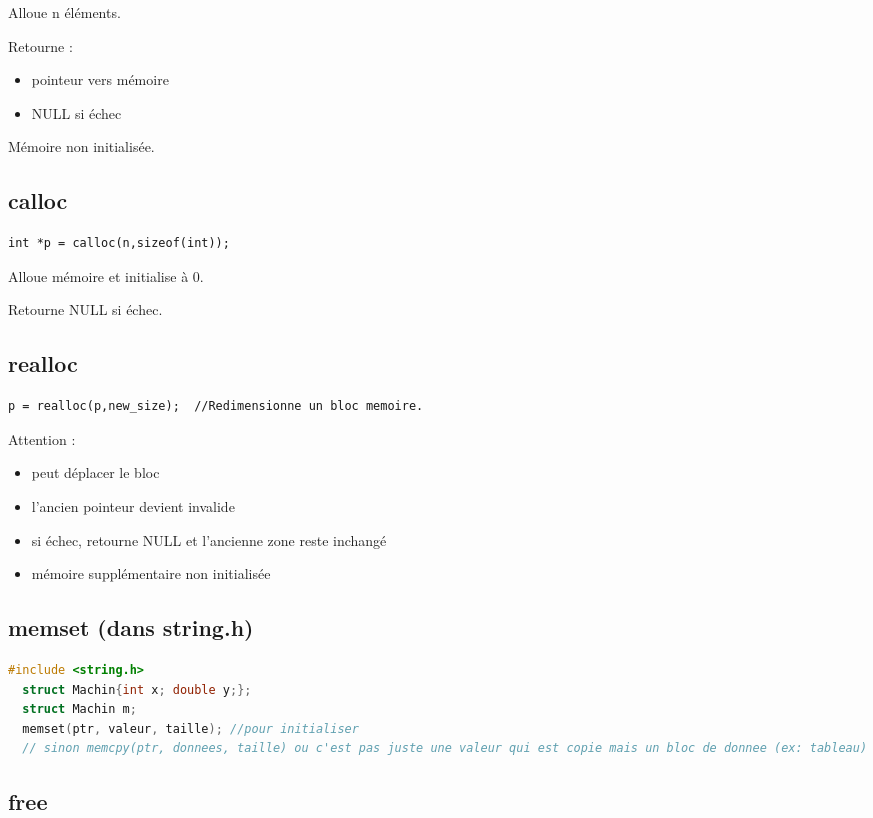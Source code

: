 \documentclass[8pt]{article}
\begin{document}
\begin{multicols}{2}
Alloue n éléments.

Retourne :

\begin{itemize}
\item pointeur vers mémoire
\item NULL si échec
\end{itemize}

Mémoire non initialisée.

\subsection{calloc}

\begin{lstlisting}
int *p = calloc(n,sizeof(int));
\end{lstlisting}

Alloue mémoire et initialise à 0.

Retourne NULL si échec.

\subsection{realloc}

\begin{lstlisting}
p = realloc(p,new_size);  //Redimensionne un bloc memoire.
\end{lstlisting}

Attention :
\begin{itemize}
\item peut déplacer le bloc
\item l'ancien pointeur devient invalide
\item si échec, retourne NULL et l'ancienne zone reste inchangé
\item mémoire supplémentaire non initialisée  
\end{itemize}

\subsection{memset (dans string.h)}
\begin{lstlisting}[language=C]
  #include <string.h> 
  struct Machin{int x; double y;};
  struct Machin m; 
  memset(ptr, valeur, taille); //pour initialiser
  // sinon memcpy(ptr, donnees, taille) ou c'est pas juste une valeur qui est copie mais un bloc de donnee (ex: tableau)
\end{lstlisting}

\subsection{free}


\end{multicols}
\end{document}
